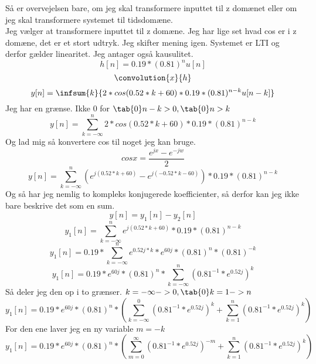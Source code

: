 \begin{Opgaver}
\begin{kapitel}
\begin{Opgave}
            \begin{UnderOpgave}
                \vspace{15pt}
            \end{UnderOpgave}
            \begin{Udklip}
                \begin{UnderOpgave}[\text{Determine analytically the response $y[n]$ to the input $x[n] = 2 cos(0.52n + 60°)$.}]
                    Så er overvejelsen bare, om jeg skal transformere inputtet til z domænet eller om jeg skal transformere systemet til tidsdomæne. \\
                    Jeg vælger at transformere inputtet til z domæne.
                    Jeg har lige set hvad cos er i z domæne, det er et stort udtryk. Jeg skifter mening igen. 
                    Systemet er LTI og derfor gælder linearitet. Jeg antager også kausulitet.
                    \[h[n] = 0.19 * (0.81)^nu[n]\]
                    \[\convolution{x}{h}\]
                    \[y[n] = \infsum{k}{2 * cos(0.52*k + 60) * 0.19 * (0.81)^{n - k}u[n - k]}\]
                    Jeg har en grænse. Ikke 0 for $\tab{0} n - k > 0, \tab{0} n > k$
                    \[y[n] = \sum_{k = -\infty}^{n}{2 * cos(0.52*k + 60) * 0.19 * (0.81)^{n - k}}\]
                    Og lad mig så konvertere cos til noget jeg kan bruge. 
                    \[cosx = \frac{e^{jx} - e^{-jw}}{2}\]
                    \[y[n] = \sum_{k = -\infty}^{n}{(e^{j(0.52*k + 60)} - e^{j(-0.52*k - 60)}) * 0.19 * (0.81)^{n - k}}\]
                    Og så har jeg nemlig to kompleks konjugerede koefficienter, så derfor kan jeg ikke bare beskrive det som en sum. 
                    \[y[n] = y_1[n] - y_2[n]\]
                    \[y_1[n] = \sum_{k = -\infty}^{n}{e^{j(0.52*k + 60)} * 0.19 * (0.81)^{n - k}}\]
                    \[y_1[n] = 0.19 * \sum_{k = -\infty}^{n}{e^{0.52j*k} * e^{60j} * (0.81)^n*(0.81)^{-k}}\]
                    \[y_1[n] = 0.19 * e^{60j} * (0.81)^n * \sum_{k = -\infty}^{n}{(0.81^{-1}*e^{0.52j})^k}\]
                    Så deler jeg den op i to grænser. $k = -\infty -> 0, \tab{0} k = 1 -> n$
                    \[y_1[n] = 0.19 * e^{60j} * (0.81)^n * (\sum_{k = -\infty}^{0}{(0.81^{-1}*e^{0.52j})^k} + \sum_{k = 1}^{n}{(0.81^{-1}*e^{0.52j})^k})\]
                    For den ene laver jeg en ny variable $m = -k$
                    \[y_1[n] = 0.19 * e^{60j} * (0.81)^n * (\sum_{m = 0}^{\infty}{(0.81^{-1}*e^{0.52j})^{-m}} + \sum_{k = 1}^{n}{(0.81^{-1}*e^{0.52j})^k})\]

\end{UnderOpgave}
\end{Udklip}
\end{Opgave}
\end{kapitel}
\end{Opgaver}
